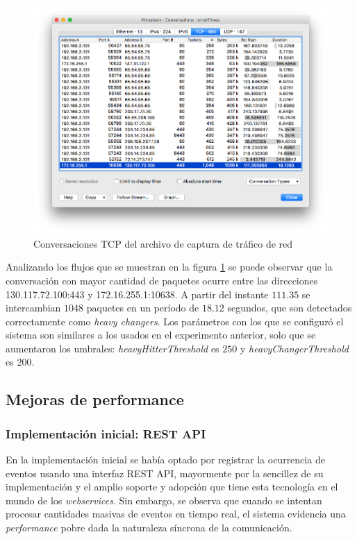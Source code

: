 \documentclass[a4paper,10pt, oneside]{article}
\begin{document}
\begin{figure}[h!]
	\centering
	\includegraphics[width=.9\textwidth]{graph/smallFlows_conversations.png}
	\caption{Conversaciones TCP del archivo de captura de tráfico de red}
	\label{fig:smallFlows_conversation}
	
\end{figure}

Analizando los flujos que se muestran en la figura \ref{fig:smallFlows_conversation} se puede observar que la conversación con mayor cantidad de paquetes ocurre entre las direcciones 130.117.72.100:443 y 172.16.255.1:10638. A partir del instante $111.35$ se intercambian $1048$ paquetes en un período de $18.12$ segundos, que son detectados correctamente como \textit{heavy changers}. Los parámetros con los que se configuró el sistema son similares a los usados en el experimento anterior, solo que se aumentaron los umbrales: \textit{heavyHitterThreshold} es $250$ y \textit{heavyChangerThreshold} es $200$.


\subsection{Mejoras de performance}
\subsubsection{Implementación inicial: REST API}
En la implementación inicial se había optado por registrar la ocurrencia de eventos usando una interfaz REST API, mayormente por la sencillez de su implementación y el amplio soporte y adopción que tiene esta tecnología en el mundo de los \textit{webservices}. Sin embargo, se observa que cuando se intentan procesar cantidades masivas de eventos en tiempo real, el sistema evidencia una \textit{performance} pobre dada la naturaleza síncrona de la comunicación.
\end{document}

